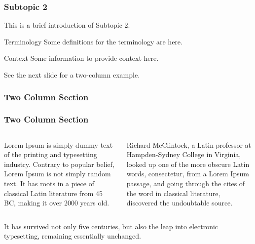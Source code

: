 \documentclass[hyperref={bookmarks=false},aspectratio=169, usenames,dvipsnames, hideothersubsections]{beamer}
\begin{document}
\begin{frame}
\frametitle{Subtopic 2}

This is a brief introduction of \alert{Subtopic 2}. %

\begin{block}{Terminology}
Some definitions for the terminology are here.
\end{block}

\begin{alertblock}{Context}
Some information to provide context here.
\end{alertblock}

\begin{examples}
See the next slide for a two-column example.
\end{examples}
\end{frame}


\begin{frame}
\frametitle{Two Column Section}

\frametitle{Two Column Section}

\begin{columns}

Lorem Ipsum is simply dummy text of the printing and typesetting industry. Contrary to popular belief, Lorem Ipsum is not simply random text. It has roots in a piece of classical Latin literature from 45 BC, making it over 2000 years old. 

Richard McClintock, a Latin professor at Hampden-Sydney College in Virginia, looked up one of the more obscure Latin words, consectetur, from a Lorem Ipsum passage, and going through the cites of the word in classical literature, discovered the undoubtable source.
\end{columns}

It has survived not only five centuries, but also the leap into electronic typesetting, remaining essentially unchanged.

\end{frame}
\end{document}

